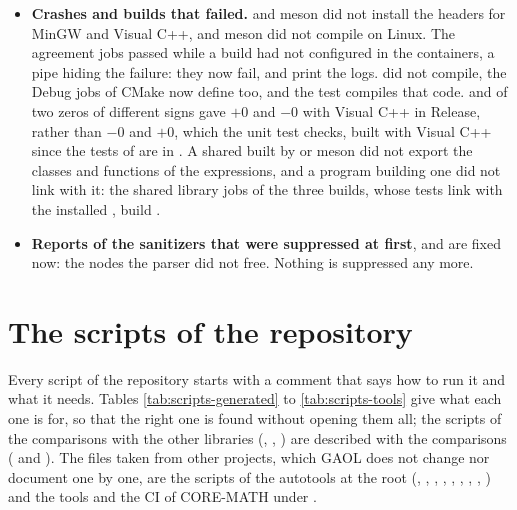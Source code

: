 \documentclass[12pt,a4paper,twoside,openright]{book}
\begin{document}
\begin{itemize}
  still computed on the x87 unit.
\item[$\bullet$] \textbf{Crashes and builds that failed.} 
  and meson did not install the headers for MinGW and Visual C++, and meson
  did not compile on Linux. The agreement jobs passed while a build had not
  configured in the containers, a pipe hiding the failure: they now fail,
  and print the logs.  did not compile, the
  Debug jobs of CMake now define  too, and the test
   compiles that code.  and 
  of two zeros of different signs gave $+0$ and $-0$ with Visual C++ in
  Release, rather than $-0$ and $+0$, which the unit test
   checks, built with Visual C++ since the tests of
   are in . A shared  built by
   or meson did not export the classes and functions of the
  expressions, and a program building one did not link with it: the shared
  library jobs of the three builds, whose tests link with the installed
  , build .
\item[$\bullet$] \textbf{Reports of the sanitizers that were suppressed at
  first}, and are fixed now: the nodes the parser did not free. Nothing is
  suppressed any more.
\end{itemize}

\section{The scripts of the repository}\label{sec:scripts}
%

Every script of the repository starts with a comment that says how to run it
and what it needs. Tables \ref{tab:scripts-generated} to
\ref{tab:scripts-tools} give what each one is for, so that the right one is
found without opening them all; the scripts of the comparisons with the
other libraries (, ,
) are described with the comparisons
( and ). The files taken from
other projects, which GAOL does not change nor document one by one, are the
scripts of the autotools at the root (,
, , , ,
, , , )
and the tools and the CI of CORE-MATH under .
\end{document}
